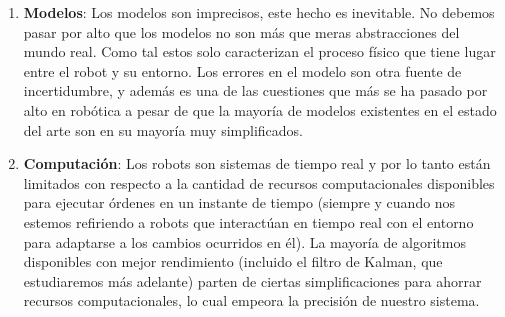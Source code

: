 \begin{enumerate}
%
%
%
%
%
 \item \textbf{Modelos}: Los modelos son imprecisos, este hecho es inevitable. No debemos pasar por alto que los modelos no son más que meras abstracciones del mundo real. Como tal estos solo caracterizan el proceso físico que tiene lugar entre el robot y su entorno. Los errores en el modelo son otra fuente de incertidumbre, y además es una de las cuestiones que más se ha pasado por alto en robótica a pesar de que la mayoría de modelos existentes en el estado del arte son en su mayoría muy simplificados.
%
%
%
 \item \textbf{Computación}: Los robots son sistemas de tiempo real y por lo tanto están limitados con respecto a la cantidad de recursos computacionales disponibles para ejecutar órdenes en un instante de tiempo (siempre y cuando nos estemos refiriendo a robots que interactúan en tiempo real con el entorno para adaptarse a los cambios ocurridos en él). La mayoría de algoritmos disponibles con mejor rendimiento (incluido el filtro de Kalman, que estudiaremos más adelante) parten de ciertas simplificaciones para ahorrar recursos computacionales, lo cual empeora la precisión de nuestro sistema.
%
%
%
%
%
%
%
%
\end{enumerate}

